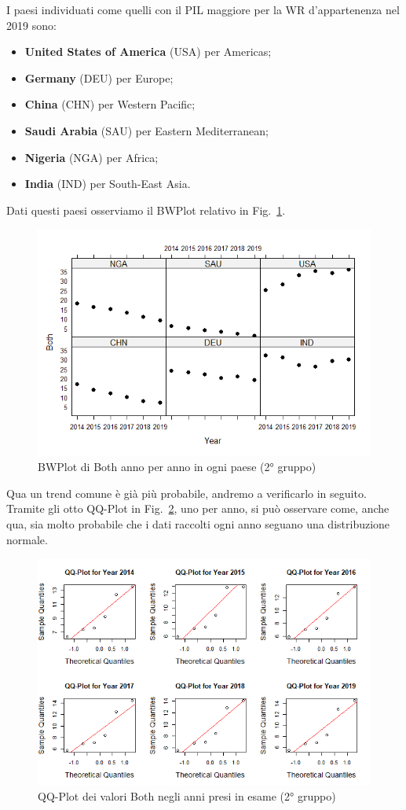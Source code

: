 \documentclass[conference]{IEEEtran}
\begin{document}
I paesi individuati come quelli con il PIL maggiore \cite{b6} per la WR
d'appartenenza nel 2019 sono:
\begin{itemize}
    \item \textbf{United States of America} (USA) per Americas;
    \item \textbf{Germany} (DEU) per Europe;
    \item \textbf{China} (CHN) per Western Pacific;
    \item \textbf{Saudi Arabia} (SAU) per Eastern Mediterranean;
    \item \textbf{Nigeria} (NGA) per Africa;
    \item \textbf{India} (IND) per South-East Asia. 
\end{itemize}
Dati questi paesi osserviamo il BWPlot relativo in Fig.~\ref{7secondgroup}.
\begin{figure}[htbp]
    \centerline{\includegraphics[width=.5\textwidth]{img/7 - Secondgroup.png}}
    \caption{BWPlot di Both anno per anno in ogni paese (2° gruppo)}
    \label{7secondgroup}
\end{figure}
Qua un trend comune è già più probabile, andremo a verificarlo in seguito.
Tramite gli otto QQ-Plot in Fig.~\ref{8secondqq}, uno per anno, si può osservare come, anche qua,
sia molto probabile che i dati raccolti ogni anno seguano una distribuzione normale.
\begin{figure}[htbp]
    \centerline{\includegraphics[width=.5\textwidth]{img/8 - Secondqq.png}}
    \caption{QQ-Plot dei valori Both negli anni presi in esame (2° gruppo)}
    \label{8secondqq}
\end{figure}
\end{document}
